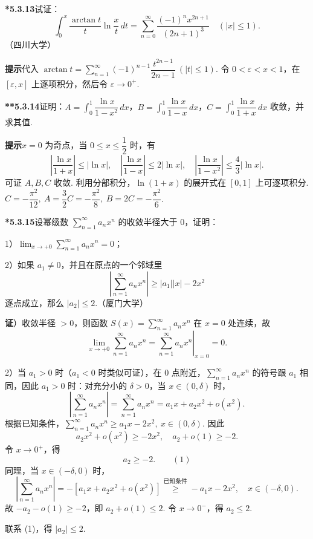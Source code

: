 \documentclass[UTF8, 12pt, fontset=fandol, oneside]{ctexart}
\begin{document}
\noindent\textbf{*5.3.13}\quad 试证：
\[
  \int_0^x\frac{\arctan t}{t}\ln\frac{x}{t}\,dt
  =\sum_{n=0}^{\infty}\frac{(-1)^nx^{2n+1}}{(2n+1)^3}\quad(|x|\le1).
\]
（四川大学）

\noindent\textbf{提示}\quad 代入 $\arctan t=\displaystyle\sum_{n=1}^{\infty}(-1)^{n-1}\dfrac{t^{2n-1}}{2n-1}\ (|t|\le1)$. 令 $0<\varepsilon<x<1$，在 $[\varepsilon,x]$ 上逐项积分，然后令 $\varepsilon\to0^+$.

\noindent\textbf{**5.3.14}\quad 证明：$A=\displaystyle\int_0^1\dfrac{\ln x}{1-x^2}\,dx$，$B=\displaystyle\int_0^1\dfrac{\ln x}{1-x}\,dx$，$C=\displaystyle\int_0^1\dfrac{\ln x}{1+x}\,dx$ 收敛，并求其值.

\noindent\textbf{提示}\quad $x=0$ 为奇点，当 $0\le x\le\dfrac12$ 时，有
\[
  \left|\frac{\ln x}{1+x}\right|\le|\ln x|,\quad
  \left|\frac{\ln x}{1-x}\right|\le2|\ln x|,\quad
  \left|\frac{\ln x}{1-x^2}\right|\le\frac43|\ln x|.
\]
可证 $A,B,C$ 收敛. 利用分部积分，$\ln(1+x)$ 的展开式在 $[0,1]$ 上可逐项积分.
$C=-\dfrac{\pi^2}{12},\ A=\dfrac32C=-\dfrac{\pi^2}{8},\ B=2C=-\dfrac{\pi^2}{6}$.

\noindent\textbf{*5.3.15}\quad 设幂级数 $\displaystyle\sum_{n=1}^{\infty}a_nx^n$ 的收敛半径大于 0，证明：

1）$\displaystyle\lim_{x\to+0}\sum_{n=1}^{\infty}a_nx^n=0$；

2）如果 $a_1\ne0$，并且在原点的一个邻域里
\[
  \left|\sum_{n=1}^{\infty}a_nx^n\right|\ge |a_1||x|-2x^2
\]
逐点成立，那么 $|a_2|\le2$.（厦门大学）

\noindent\textbf{证}）收敛半径 $>0$，则函数 $S(x)=\displaystyle\sum_{n=1}^{\infty}a_nx^n$ 在 $x=0$ 处连续，故
\[
  \lim_{x\to+0}\sum_{n=1}^{\infty}a_nx^n
  =\left.\sum_{n=1}^{\infty}a_nx^n\right|_{x=0}=0.
\]

2）当 $a_1>0$ 时（$a_1<0$ 时类似可证），在 0 点附近，$\displaystyle\sum_{n=1}^{\infty}a_nx^n$ 的符号跟 $a_1$ 相同，因此 $a_1>0$ 时：对充分小的 $\delta>0$，当 $x\in(0,\delta)$ 时，
\[
  \left|\sum_{n=1}^{\infty}a_nx^n\right|
  =\sum_{n=1}^{\infty}a_nx^n
  =a_1x+a_2x^2+o(x^2).
\]
根据已知条件，$\displaystyle\sum_{n=1}^{\infty}a_nx^n\ge a_1x-2x^2,\ x\in(0,\delta)$. 因此
\[
  a_2x^2+o(x^2)\ge-2x^2,\quad a_2+o(1)\ge-2.
\]
令 $x\to0^+$，得
\[
  a_2\ge-2. \qquad(1)
\]
同理，当 $x\in(-\delta,0)$ 时，
\[
  \left|\sum_{n=1}^{\infty}a_nx^n\right|
  =-\left[a_1x+a_2x^2+o(x^2)\right]
  \overset{\text{已知条件}}{\ge}-a_1x-2x^2,\quad x\in(-\delta,0).
\]
故 $-a_2-o(1)\ge-2$，即 $a_2+o(1)\le2$. 令 $x\to0^-$，得 $a_2\le2$.

联系 (1)，得 $|a_2|\le2$.
\end{document}
